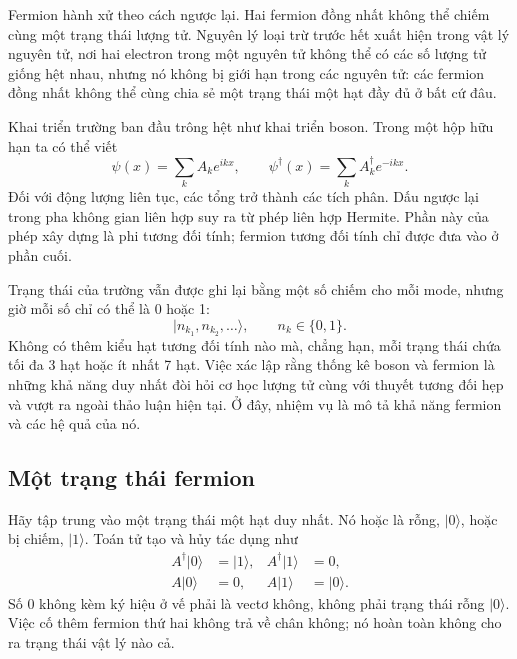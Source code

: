 Fermion hành xử theo cách ngược lại. Hai fermion đồng nhất không thể chiếm cùng một trạng thái lượng tử. Nguyên lý loại trừ trước hết xuất hiện trong vật lý nguyên tử, nơi hai electron trong một nguyên tử không thể có các số lượng tử giống hệt nhau, nhưng nó không bị giới hạn trong các nguyên tử: các fermion đồng nhất không thể cùng chia sẻ một trạng thái một hạt đầy đủ ở bất cứ đâu.

Khai triển trường ban đầu trông hệt như khai triển boson. Trong một hộp hữu hạn ta có thể viết
\begin{equation}
\psi(x)=\sum_k A_k e^{ikx},
\qquad
\psi^\dagger(x)=\sum_k A_k^\dagger e^{-ikx}.
\end{equation}
Đối với động lượng liên tục, các tổng trở thành các tích phân. Dấu ngược lại trong pha không gian liên hợp suy ra từ phép liên hợp Hermite. Phần này của phép xây dựng là phi tương đối tính; fermion tương đối tính chỉ được đưa vào ở phần cuối.

Trạng thái của trường vẫn được ghi lại bằng một số chiếm cho mỗi mode, nhưng giờ mỗi số chỉ có thể là 0 hoặc 1:
\begin{equation}
|n_{k_1},n_{k_2},\ldots\rangle,
\qquad n_k\in\{0,1\}.
\end{equation}
Không có thêm kiểu hạt tương đối tính nào mà, chẳng hạn, mỗi trạng thái chứa tối đa 3 hạt hoặc ít nhất 7 hạt. Việc xác lập rằng thống kê boson và fermion là những khả năng duy nhất đòi hỏi cơ học lượng tử cùng với thuyết tương đối hẹp và vượt ra ngoài thảo luận hiện tại. Ở đây, nhiệm vụ là mô tả khả năng fermion và các hệ quả của nó.

\subsection{Một trạng thái fermion}

Hãy tập trung vào một trạng thái một hạt duy nhất. Nó hoặc là rỗng, \(|0\rangle\), hoặc bị chiếm, \(|1\rangle\). Toán tử tạo và hủy tác dụng như
\begin{align}
A^\dagger|0\rangle&=|1\rangle,
&
A^\dagger|1\rangle&=0,
\\
A|0\rangle&=0,
&
A|1\rangle&=|0\rangle.
\end{align}
Số 0 không kèm ký hiệu ở vế phải là vectơ không, không phải trạng thái rỗng \(|0\rangle\). Việc cố thêm fermion thứ hai không trả về chân không; nó hoàn toàn không cho ra trạng thái vật lý nào cả.

\begin{classroomqa}
\end{classroomqa}

